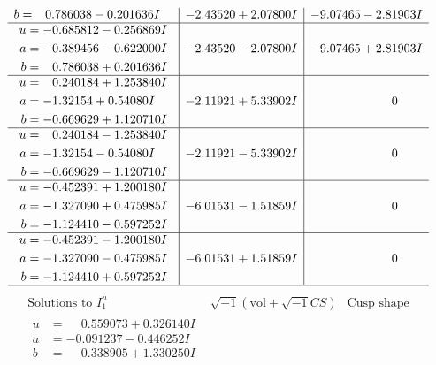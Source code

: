 \documentclass[1p]{elsarticle_modified}
\theoremstyle{definition}
\newcommand{\I}{\sqrt{-1}}
\begin{document}
$$\begin{array}{c|c|c}
\begin{aligned}
b &= \phantom{-}0.786038 - 0.201636 I\end{aligned}
 & -2.43520 + 2.07800 I & -9.07465 - 2.81903 I \\ \hline\begin{aligned}
u &= -0.685812 - 0.256869 I \\
a &= -0.389456 - 0.622000 I \\
b &= \phantom{-}0.786038 + 0.201636 I\end{aligned}
 & -2.43520 - 2.07800 I & -9.07465 + 2.81903 I \\ \hline\begin{aligned}
u &= \phantom{-}0.240184 + 1.253840 I \\
a &= -1.32154 + 0.54080 I \\
b &= -0.669629 + 1.120710 I\end{aligned}
 & -2.11921 + 5.33902 I & \phantom{-0.000000 } 0 \\ \hline\begin{aligned}
u &= \phantom{-}0.240184 - 1.253840 I \\
a &= -1.32154 - 0.54080 I \\
b &= -0.669629 - 1.120710 I\end{aligned}
 & -2.11921 - 5.33902 I & \phantom{-0.000000 } 0 \\ \hline\begin{aligned}
u &= -0.452391 + 1.200180 I \\
a &= -1.327090 + 0.475985 I \\
b &= -1.124410 - 0.597252 I\end{aligned}
 & -6.01531 - 1.51859 I & \phantom{-0.000000 } 0 \\ \hline\begin{aligned}
u &= -0.452391 - 1.200180 I \\
a &= -1.327090 - 0.475985 I \\
b &= -1.124410 + 0.597252 I\end{aligned}
 & -6.01531 + 1.51859 I & \phantom{-0.000000 } 0\\
 \hline 
 \end{array}$$\newpage$$\begin{array}{c|c|c}  
\text{Solutions to }I^u_{1}& \I (\text{vol} + \sqrt{-1}CS) & \text{Cusp shape}\\
 \hline 
\begin{aligned}
u &= \phantom{-}0.559073 + 0.326140 I \\
a &= -0.091237 - 0.446252 I \\
b &= \phantom{-}0.338905 + 1.330250 I\end{aligned}

\end{array}$$
\end{document}

